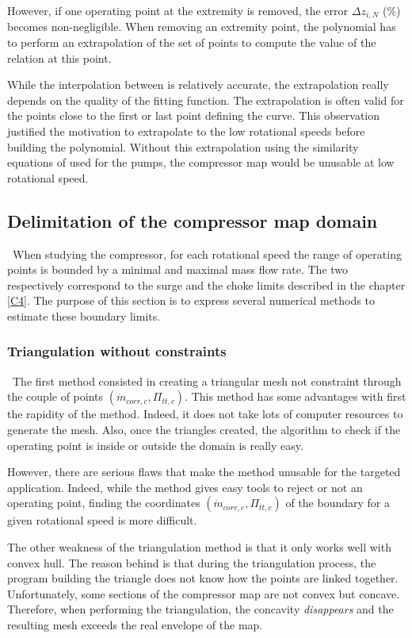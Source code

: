 However, if one operating point at the extremity is removed, the error $\Delta z_{i,N}$ (\%) becomes non-negligible. When removing an extremity point, the polynomial has to perform an extrapolation of the set of points to compute the value of the relation at this point. 

While the interpolation between is relatively accurate, the extrapolation really depends on the quality of the fitting function. The extrapolation is often valid for the points close to the first or last point defining the curve. This observation justified the motivation to extrapolate to the low rotational speeds before building the polynomial. Without this extrapolation using the similarity equations of used for the pumps, the compressor map would be unusable at low rotational speed. 

\subsection{Delimitation of the compressor map domain}
\quad\ When studying the compressor, for each rotational speed the range of operating points is bounded by a minimal and maximal mass flow rate. The two respectively correspond to the surge and the choke limits described in the chapter \ref{C4}. The purpose of this section is to express several numerical methods to estimate these boundary limits.

\subsubsection{Triangulation without constraints}
\quad\ The first method consisted in creating a triangular mesh not constraint through the couple of points $(\dot{m}_{corr,c},\Pi_{tt,c})$. This method has some advantages with first the rapidity of the method. Indeed, it does not take lots of computer resources to generate the mesh. Also, once the triangles created, the algorithm to check if the operating point is inside or outside the domain is really easy.

However, there are serious flaws that make the method unusable for the targeted application. Indeed, while the method gives easy tools to reject or not an operating point, finding the coordinates $(\dot{m}_{corr,c},\Pi_{tt,c})$ of the boundary for a given rotational speed is more difficult. 

The other weakness of the triangulation method is that it only works well with convex hull. The reason behind is that during the triangulation process, the program building the triangle does not know how the points are linked together. Unfortunately, some sections of the compressor map are not convex but concave. Therefore, when performing the triangulation, the concavity \textit{disappears} and the resulting mesh exceeds the real envelope of the map.


